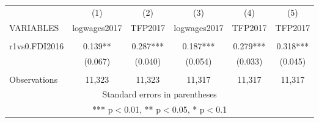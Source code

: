 \documentclass[]{article}
\begin{document}
\begin{tabular}{lccccc} \hline
 & (1) & (2) & (3) & (4) & (5) \\
VARIABLES & logwages2017 & TFP2017 & logwages2017 & TFP2017 & TFP2017 \\ \hline
 &  &  &  &  &  \\
r1vs0.FDI2016 & 0.139** & 0.287*** & 0.187*** & 0.279*** & 0.318*** \\
 & (0.067) & (0.040) & (0.054) & (0.033) & (0.045) \\
 &  &  &  &  &  \\
 Observations & 11,323 & 11,323 & 11,317 & 11,317 & 11,317 \\ \hline
\multicolumn{6}{c}{ Standard errors in parentheses} \\
\multicolumn{6}{c}{ *** p$<$0.01, ** p$<$0.05, * p$<$0.1} \\
\end{tabular}
\end{document}
